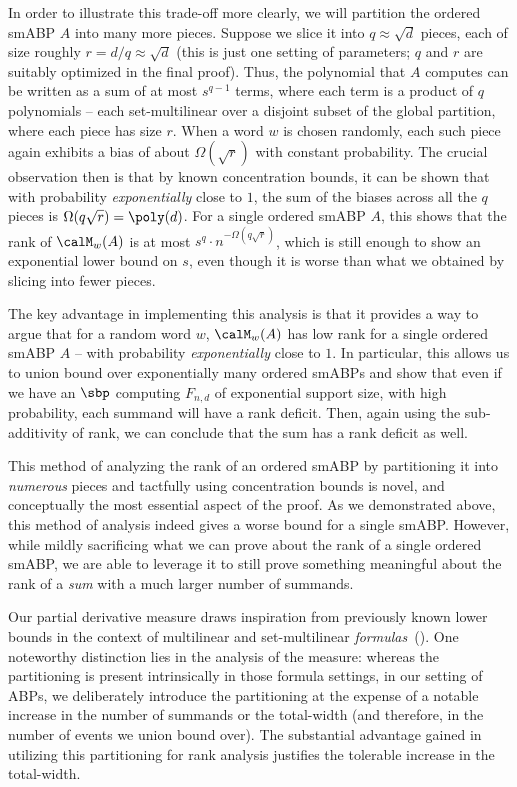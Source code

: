 \documentclass{article}
\begin{document}
In order to illustrate this trade-off more clearly, we will partition the ordered smABP $A$ into many more pieces. Suppose we slice it into $q \approx \sqrt{d}$ pieces, each of size roughly $r = d/q \approx \sqrt{d}$ (this is just one setting of parameters;
$q$ and $r$ are suitably optimized in the final proof).
Thus, the polynomial that $A$ computes can be written as a sum of at most $s^{q-1}$ terms, where each term is a product of $q$ polynomials -- each set-multilinear over a disjoint subset of the global partition, where each piece has size $r$. When a word $w$ is chosen randomly, each such piece again exhibits a bias of  about $\Omega(\sqrt{r})$ with constant probability. The crucial observation then is that by known concentration bounds, it can be shown that with
probability \emph{exponentially} close to $1$, the sum of the biases across all the $q$ pieces is $\Omega(q\sqrt{r}) = \poly(d)$.
For a single ordered smABP $A$, this shows that the rank of $\calM_w(A)$ is at most $s^{q} \cdot n^{-\Omega(q\sqrt{r})}$, which is still enough to show an exponential lower bound on $s$, even though it is worse
than what we obtained by slicing into fewer pieces. 

The key advantage in implementing this analysis is that it provides a way to argue that for a random word $w$, $\calM_w(A)$ has low rank for a single ordered smABP $A$ -- with probability \emph{exponentially} close to $1$.
In particular, this allows us to union bound over exponentially many ordered smABPs and show that even if we have an $\sbp$ computing $F_{n,d}$ of exponential support size, with high probability, each summand will have a rank deficit. Then, again using the sub-additivity of rank, we can conclude that the sum has a rank deficit as well.

This method of analyzing the rank of an ordered smABP by partitioning it into {\em numerous} pieces and tactfully using concentration bounds is novel, and conceptually the most essential aspect of the proof. As we demonstrated above, this method of analysis indeed gives a worse bound for a single smABP. However, while mildly sacrificing what we can prove about the rank of a single ordered smABP, we are able to leverage it to still prove something meaningful about the rank of a {\it sum} with a much larger number of summands. 

Our partial derivative measure draws inspiration from previously known lower bounds in the context of multilinear and set-multilinear {\it formulas~}(\cite{Raz06, KushS22}). One noteworthy distinction lies in the analysis of the measure: whereas the partitioning is present intrinsically in those formula settings, in our setting of ABPs, we deliberately introduce the partitioning at the expense of a notable increase in the number of summands or the total-width (and therefore, in the number of events we union bound over). The substantial advantage gained in utilizing this partitioning for rank analysis justifies the tolerable increase in the total-width.
\end{document}
